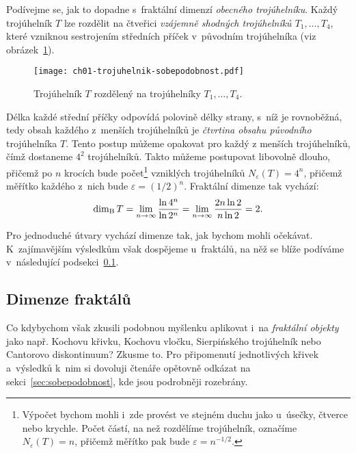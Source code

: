 \begin{example}\label{ex:fraktalni-dimenze-trojuhelnik}
    Podívejme se, jak to dopadne s~fraktální dimenzí \emph{obecného trojúhelníku}. Každý trojúhelník $T$ lze rozdělit na čtveřici \emph{vzájemně shodných trojúhelníků $T_1,\dots,T_4$}, které vzniknou sestrojením středních příček v~původním trojúhelníka (viz obrázek~\ref{fig:trojuhelnik-sobepodobnost}).
    \begin{figure}[h]
        \centering
        \texttt{[image: ch01-trojuhelnik-sobepodobnost.pdf]}
        \caption{Trojúhelník $T$ rozdělený na trojúhelníky $T_1,\dots,T_4$.}
        \label{fig:trojuhelnik-sobepodobnost}
    \end{figure}
    Délka každé střední příčky odpovídá polovině délky strany, s~níž je rovnoběžná, tedy obsah každého z~menších trojúhelníků je \emph{čtvrtina obsahu původního} trojúhelníka $T$. Tento postup můžeme opakovat pro každý z menších trojúhelníků, čímž dostaneme $4^2$ trojúhelníků. Takto můžeme postupovat libovolně dlouho, přičemž po $n$ krocích bude počet\footnote{Výpočet bychom mohli i~zde provést ve stejném duchu jako u~úsečky, čtverce nebo krychle. Počet částí, na než rozdělíme trojúhelník, označíme $N_\varepsilon(T)=n$, přičemž měřítko pak bude $\varepsilon=n^{-1/2}$.} vzniklých trojúhelníků $N_\varepsilon(T)=4^n$, přičemž měřítko každého z~nich bude $\varepsilon=(1/2)^n$. Fraktální dimenze tak vychází:
    \[\operatorname{dim_B}{T}=\lim_{n\to\infty}{\dfrac{\ln{4^n}}{\ln{2^n}}}=\lim_{n\to\infty}{\dfrac{2n\ln{2}}{n\ln{2}}}=2.\]
\end{example}
Pro jednoduché útvary vychází dimenze tak, jak bychom mohli očekávat. K~zajímavějším výsledkům však dospějeme u~fraktálů, na něž se blíže podíváme v~následující podsekci~\ref{subsec:dimenze-fraktalu}.

\subsection{Dimenze fraktálů}\label{subsec:dimenze-fraktalu}

Co kdybychom však zkusili podobnou myšlenku aplikovat i~na \emph{fraktální objekty} jako např. Kochovu křivku, Kochovu vločku, Sierpińského trojúhelník nebo Cantorovo diskontinuum? Zkusme to. Pro připomenutí jednotlivých křivek a~výsledků k~nim si dovoluji čtenáře opětovně odkázat na sekci~\ref{sec:sobepodobnost}, kde jsou podrobněji rozebrány.


